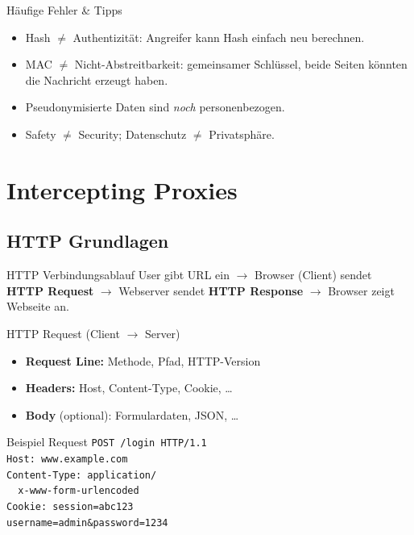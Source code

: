 \documentclass[a4paper, fontsize=7pt]{scrartcl}
\begin{document}
\begin{subbox}{Häufige Fehler \& Tipps}
\begin{itemize}
    \item Hash $\neq$ Authentizität: Angreifer kann Hash einfach neu berechnen.
    \item MAC $\neq$ Nicht-Abstreitbarkeit: gemeinsamer Schlüssel, beide Seiten
          könnten die Nachricht erzeugt haben.
    \item Pseudonymisierte Daten sind \emph{noch} personenbezogen.
    \item Safety $\neq$ Security; Datenschutz $\neq$ Privatsphäre.
\end{itemize}
\end{subbox}

\section{Intercepting Proxies}

\subsection{HTTP Grundlagen}

\begin{mainbox}{HTTP Verbindungsablauf}
User gibt URL ein $\to$ Browser (Client) sendet \textbf{HTTP Request} $\to$
Webserver sendet \textbf{HTTP Response} $\to$ Browser zeigt Webseite an.
\end{mainbox}

\begin{mainbox}{HTTP Request (Client $\to$ Server)}
\begin{itemize}
    \item \textbf{Request Line:} Methode, Pfad, HTTP-Version
    \item \textbf{Headers:} Host, Content-Type, Cookie, \ldots
    \item \textbf{Body} (optional): Formulardaten, JSON, \ldots
\end{itemize}
\end{mainbox}

\begin{subbox}{Beispiel Request}
\texttt{POST /login HTTP/1.1}\\
\texttt{Host: www.example.com}\\
\texttt{Content-Type: application/}\\
\texttt{\ \ x-www-form-urlencoded}\\
\texttt{Cookie: session=abc123}\\[2pt]
\texttt{username=admin\&password=1234}
\end{subbox}
\end{document}
